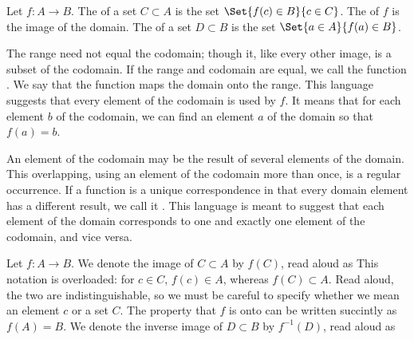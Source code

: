 
Let $f: A \to B$.
The  of a set $C \subset A$ is the set $\Set{f(c) \in B}{c \in C}$.
The  of $f$ is the image of the domain.
The  of a set $D \subset B$ is the set $\Set{a \in A}{f(a) \in B}$.

The range need not equal the codomain; though it, like every other image, is a subset of the codomain.
If the range and codomain are equal, we call the function .
We say that the function maps the domain onto the range.
This language suggests that every element of the codomain is used by $f$.
It means that for each element $b$ of the codomain, we can find an element $a$ of the domain so that $f(a) = b$.

An element of the codomain may be the result of several elements of the domain.
This overlapping, using an element of the codomain more than once, is a regular occurrence.
If a function is a unique correspondence in that every domain element has a different result, we call it .
This language is meant to suggest that each element of the domain corresponds to one and exactly one element of the codomain, and vice versa.


Let $f: A \to B$.
We denote the image of $C \subset A$ by $f(C)$, read aloud as 
This notation is overloaded: for $c \in C$, $f(c) \in A$, whereas $f(C) \subset A$.
Read aloud, the two are indistinguishable, so we must be careful to specify whether we mean an element $c$ or a set $C$.
The property that $f$ is onto can be written succintly as $f(A) = B$.
We denote the inverse image of $D \subset B$ by $f^{-1}(D)$, read aloud as 


\strats
